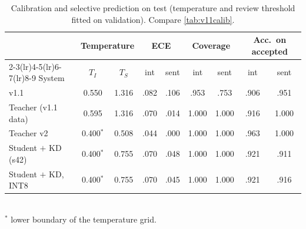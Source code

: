 \documentclass[11pt,a4paper]{article}
\theoremstyle{remark}
\begin{document}
\begin{table}[h]
\centering\small
\caption{Calibration and selective prediction on test (temperature and review threshold fitted on validation). Compare \cref{tab:v11calib}.}
\label{tab:v12calib}
\begin{tabular}{@{}l cc cc cc cc@{}}
\toprule
& \multicolumn{2}{c}{Temperature} & \multicolumn{2}{c}{ECE} & \multicolumn{2}{c}{Coverage} & \multicolumn{2}{c}{Acc.\ on accepted} \\
\cmidrule(lr){2-3}\cmidrule(lr){4-5}\cmidrule(lr){6-7}\cmidrule(lr){8-9}
System & $T_I$ & $T_S$ & int & sent & int & sent & int & sent \\
\midrule
v1.1 & 0.550 & 1.316 &.082 &.106 &.953 &.753 &.906 &.951 \\
Teacher (v1.1 data) & 0.595 & 1.316 &.070 &.014 & 1.000 & 1.000 &.916 & 1.000 \\
Teacher v2 & 0.400$^\ast$ & 0.508 &.044 &.000 & 1.000 & 1.000 &.963 & 1.000 \\
Student $+$ KD (s42) & 0.400$^\ast$ & 0.755 &.070 &.048 & 1.000 & 1.000 &.921 &.911 \\
Student $+$ KD, INT8 & 0.400$^\ast$ & 0.755 &.070 &.045 & 1.000 & 1.000 &.921 &.916 \\
\bottomrule
\end{tabular}
\\[2pt]{\footnotesize $^\ast$ lower boundary of the temperature grid.}
\end{table}
\end{document}
